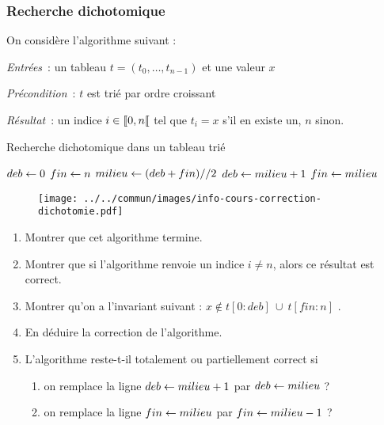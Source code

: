 \documentclass{magnolia}
\begin{document}
\subsubsection{Recherche dichotomique}

  On considère l'algorithme suivant :
  \begin{description}
    \item \emph{Entrées}~: un tableau $t = (t_{0}, \dots, t_{n - 1})$ et une valeur $x$
    \item \emph{Précondition}~: $t$ est trié par ordre croissant
    \item \emph{Résultat}~: un indice $i \in\left\llbracket 0,n\right\llbracket$ tel que $t_{i} = x$ s'il
          en existe un, $n$ sinon.
  \end{description}
  \begin{algorithm}[H]
    \caption{Recherche dichotomique dans un tableau trié}
  \begin{algorithmic}
        \State $deb \leftarrow 0$
        \State $fin \leftarrow n$
          \State $milieu \leftarrow (deb + fin) // 2$ 
            \State {}
            \State $deb \leftarrow milieu + 1$
          \Else
            \State $fin \leftarrow milieu$
          \EndIf
        \EndWhile
        \State {}
      \EndFunction
    \end{algorithmic}
    \end{algorithm}
    \begin{figure}[H]
      \centering
      \begin{center}
        \texttt{[image: ../../commun/images/info-cours-correction-dichotomie.pdf]}
        \end{center}
    \end{figure}
    \begin{enumerate}
      \item Montrer que cet algorithme termine.
      \item Montrer que si l'algorithme renvoie un indice $i \neq n$, alors ce
            résultat est correct.
      \item Montrer qu'on a l'invariant suivant :
            \og $x \notin t[0:deb]\ \cup\ t[fin:n]$ \fg.
      \item En déduire la correction de l'algorithme.
      \item L'algorithme reste-t-il totalement ou partiellement correct si
            \begin{enumerate}
              \item on remplace la ligne $deb \leftarrow milieu + 1$ par
                    $deb \leftarrow milieu$ ?
              \item on remplace la ligne $fin \leftarrow milieu$ par
                    $fin \leftarrow milieu - 1$ ?
            \end{enumerate}
    \end{enumerate}
\end{document}
